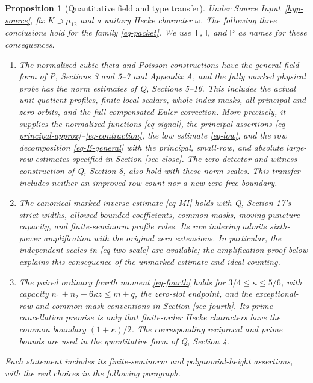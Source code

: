 \documentclass[11pt,a4paper]{article}
\newtheorem{proposition}[theorem]{Proposition}
\theoremstyle{remark}\newtheorem{remark}[theorem]{Remark}
\numberwithin{equation}{section}
\begin{document}
\begin{proposition}[Quantitative field and type transfer]\label{hyp-main}
Under Source Input~\ref{hyp-source}, fix $K\supset\mu_{12}$ and
a unitary Hecke character $\omega$. The following three conclusions
hold for the family \eqref{eq-packet}. We use $\mathsf T$, $\mathsf I$,
and $\mathsf P$ as names for these consequences.
\begin{enumerate}
\item[\(\mathsf T\).]
The normalized cubic theta and Poisson constructions have the
general-field form of P, Sections 3 and 5--7 and Appendix A,
and the fully marked physical probe has the norm estimates of
Q, Sections 5--16. This includes the actual unit-quotient profiles,
finite local scalars, whole-index masks, all principal and zero
orbits, and the full compensated Euler correction. More precisely,
it supplies the normalized functions \eqref{eq-signal},
the principal assertions \eqref{eq-principal-approx}--\eqref{eq-contraction},
the low estimate \eqref{eq-low}, and the row decomposition
\eqref{eq-E-general} with the principal, small-row, and absolute
large-row estimates specified in Section \ref{sec-close}.
The zero detector and witness construction of Q, Section 8,
also hold with these norm scales. This transfer includes neither an improved row count nor a new
zero-free boundary.

\item[\(\mathsf I\).]
The canonical marked inverse estimate \eqref{eq-MI} holds with
Q, Section 17's strict widths, allowed bounded coefficients,
common masks, moving-puncture capacity, and finite-seminorm
profile rules. Its row indexing admits sixth-power amplification
with the original zero extensions. In particular, the independent
scales in \eqref{eq-two-scale} are available; the amplification
proof below explains this consequence of the unmarked estimate
and ideal counting.

\item[\(\mathsf P\).]
The paired ordinary fourth moment \eqref{eq-fourth} holds for
$3/4\le\kappa\le5/6$, with capacity
$n_1+n_2+6\kappa z\le m+q$, the zero-slot endpoint,
and the exceptional-row and common-mask conventions in
Section \ref{sec-fourth}. Its prime-cancellation premise is only
that finite-order Hecke characters have the common boundary
$(1+\kappa)/2$. The corresponding reciprocal and prime bounds
are used in the quantitative form of Q, Section 4.
\end{enumerate}
Each statement includes its finite-seminorm and polynomial-height
assertions, with the real choices in the following paragraph.
\end{proposition}
\end{document}
